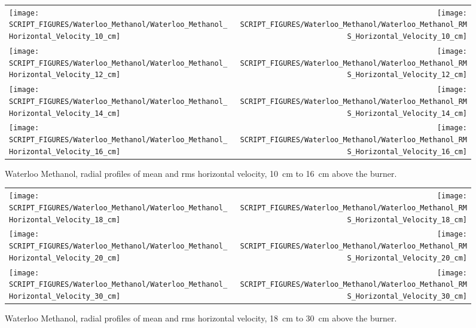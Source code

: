 \begin{figure}[p]
\begin{tabular*}{\textwidth}{l@{\extracolsep{\fill}}r}
\texttt{[image: SCRIPT\_FIGURES/Waterloo\_Methanol/Waterloo\_Methanol\_Horizontal\_Velocity\_10\_cm]} &
\texttt{[image: SCRIPT\_FIGURES/Waterloo\_Methanol/Waterloo\_Methanol\_RMS\_Horizontal\_Velocity\_10\_cm]} \\
\texttt{[image: SCRIPT\_FIGURES/Waterloo\_Methanol/Waterloo\_Methanol\_Horizontal\_Velocity\_12\_cm]} &
\texttt{[image: SCRIPT\_FIGURES/Waterloo\_Methanol/Waterloo\_Methanol\_RMS\_Horizontal\_Velocity\_12\_cm]} \\
\texttt{[image: SCRIPT\_FIGURES/Waterloo\_Methanol/Waterloo\_Methanol\_Horizontal\_Velocity\_14\_cm]} &
\texttt{[image: SCRIPT\_FIGURES/Waterloo\_Methanol/Waterloo\_Methanol\_RMS\_Horizontal\_Velocity\_14\_cm]} \\
\texttt{[image: SCRIPT\_FIGURES/Waterloo\_Methanol/Waterloo\_Methanol\_Horizontal\_Velocity\_16\_cm]} &
\texttt{[image: SCRIPT\_FIGURES/Waterloo\_Methanol/Waterloo\_Methanol\_RMS\_Horizontal\_Velocity\_16\_cm]}
\end{tabular*}
\caption[Waterloo Methanol, radial mean and rms horizontal velocity, 10~cm to 16~cm above burner]
{Waterloo Methanol, radial profiles of mean and rms horizontal velocity, 10~cm to 16~cm above the burner.}
\label{Water_Methanol_Hori_Vel_2}
\end{figure}

\begin{figure}[p]
\begin{tabular*}{\textwidth}{l@{\extracolsep{\fill}}r}
\texttt{[image: SCRIPT\_FIGURES/Waterloo\_Methanol/Waterloo\_Methanol\_Horizontal\_Velocity\_18\_cm]} &
\texttt{[image: SCRIPT\_FIGURES/Waterloo\_Methanol/Waterloo\_Methanol\_RMS\_Horizontal\_Velocity\_18\_cm]} \\
\texttt{[image: SCRIPT\_FIGURES/Waterloo\_Methanol/Waterloo\_Methanol\_Horizontal\_Velocity\_20\_cm]} &
\texttt{[image: SCRIPT\_FIGURES/Waterloo\_Methanol/Waterloo\_Methanol\_RMS\_Horizontal\_Velocity\_20\_cm]} \\
\texttt{[image: SCRIPT\_FIGURES/Waterloo\_Methanol/Waterloo\_Methanol\_Horizontal\_Velocity\_30\_cm]} &
\texttt{[image: SCRIPT\_FIGURES/Waterloo\_Methanol/Waterloo\_Methanol\_RMS\_Horizontal\_Velocity\_30\_cm]}
\end{tabular*}
\caption[Waterloo Methanol, radial mean and rms horizontal velocity, 18~cm to 30~cm above burner]
{Waterloo Methanol, radial profiles of mean and rms horizontal velocity, 18~cm to 30~cm above the burner.}
\label{Water_Methanol_Hori_Vel_3}
\end{figure}


